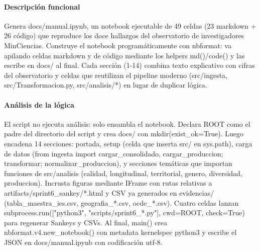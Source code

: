 \paragraph{Descripción funcional}
Genera docs/manual.ipynb, un notebook ejecutable de 49 celdas (23 markdown + 26 código) que reproduce los doce hallazgos del observatorio de investigadores MinCiencias. Construye el notebook programáticamente con nbformat: va apilando celdas markdown y de código mediante los helpers md()/code() y las escribe en docs/ al final. Cada sección (1-14) combina texto explicativo con cifras del observatorio y celdas que reutilizan el pipeline moderno (src/ingesta, src/Transformacion.py, src/analisis/*) en lugar de duplicar lógica.

\paragraph{Análisis de la lógica}
El script no ejecuta análisis: solo ensambla el notebook. Declara ROOT como el padre del directorio del script y crea docs/ con mkdir(exist\_ok=True). Luego encadena 14 secciones: portada, setup (celda que inserta src/ en sys.path), carga de datos (from ingesta import cargar\_consolidado, cargar\_produccion; transformar; normalizar\_produccion), y secciones temáticas que importan funciones de src/analisis (calidad, longitudinal, territorial, genero, diversidad, produccion). Incrusta figuras mediante IFrame con rutas relativas a artifacts/sprint6\_sankey/*.html y CSV ya generados en evidencias/ (tabla\_maestra\_ies.csv, geografia\_*.csv, ocde\_*.csv). Cuatro celdas lanzan subprocess.run(["python3", "scripts/sprint6\_*.py"], cwd=ROOT, check=True) para regenerar Sankeys y CSVs. Al final, main() crea nbformat.v4.new\_notebook() con metadata kernelspec python3 y escribe el JSON en docs/manual.ipynb con codificación utf-8.

